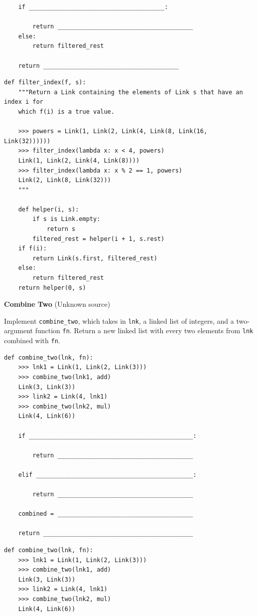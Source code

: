 \documentclass{exam}
\newlength{\currentparskip}
\newenvironment{blocksection}
{
    \setlength{\currentparskip}{\parskip}%
    \begin{minipage}{\linewidth}
    \setlength{\parskip}{\currentparskip}%
}
{
    \end{minipage}
}
\begin{document}
\begin{questions}
\begin{blocksection}
\begin{lstlisting}
    if ______________________________________:

        return ______________________________________
    else:
        return filtered_rest

    return ______________________________________
\end{lstlisting}
\end{blocksection}
\begin{solution}
\begin{lstlisting}
def filter_index(f, s):
    """Return a Link containing the elements of Link s that have an index i for
    which f(i) is a true value.
    
    >>> powers = Link(1, Link(2, Link(4, Link(8, Link(16, Link(32))))))
    >>> filter_index(lambda x: x < 4, powers)
    Link(1, Link(2, Link(4, Link(8))))
    >>> filter_index(lambda x: x % 2 == 1, powers)
    Link(2, Link(8, Link(32)))
    """
    
    def helper(i, s):
        if s is Link.empty:
            return s
        filtered_rest = helper(i + 1, s.rest)
    if f(i):
        return Link(s.first, filtered_rest)
    else:
        return filtered_rest
    return helper(0, s)
\end{lstlisting}
\end{solution}

\begin{blocksection}
\question \textbf{Combine Two} (Unknown source)

    Implement \lstinline{combine_two}, which takes in \lstinline{lnk}, a linked list of integers, and a two-argument function \lstinline{fn}. Return a new linked list with every two elements from \lstinline{lnk} combined with \lstinline{fn}.
\begin{lstlisting}
def combine_two(lnk, fn):
    >>> lnk1 = Link(1, Link(2, Link(3)))
    >>> combine_two(lnk1, add)
    Link(3, Link(3))
    >>> link2 = Link(4, lnk1)
    >>> combine_two(lnk2, mul)
    Link(4, Link(6))

    if ______________________________________________:

        return ______________________________________

    elif ____________________________________________:

        return ______________________________________
        
    combined = ______________________________________

    return __________________________________________
\end{lstlisting}
\end{blocksection}
\begin{solution}
\begin{lstlisting}
def combine_two(lnk, fn):
    >>> lnk1 = Link(1, Link(2, Link(3)))
    >>> combine_two(lnk1, add)
    Link(3, Link(3))
    >>> link2 = Link(4, lnk1)
    >>> combine_two(lnk2, mul)
    Link(4, Link(6))


\end{lstlisting}
\end{solution}
\end{questions}
\end{document}
